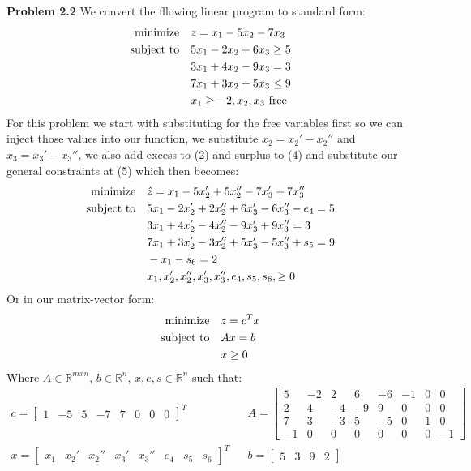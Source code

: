 \documentclass{article}
\begin{document}
\textbf{Problem 2.2} We convert the fllowing linear program to standard form:
\begin{align}
    \text{minimize} &\null \quad z = x_1 - 5x_2 - 7x_3 \\ 
    \text{subject to} &\null \quad 5x_1 - 2x_2 + 6x_3 \geq 5 \\
    & \quad 3x_1 + 4x_2 - 9x_3 = 3 \\
    & \quad 7x_1 + 3x_2 + 5x_3 \leq 9 \\
    & \quad x_1 \geq -2, x_2, x_3 \text{ free}
\end{align}
For this problem we start with substituting for the free variables first so we can inject those values into our function, we substitute $x_2 = x_2' - x_2''$ and $x_3 = x_3' - x_3''$, we also add excess to (2) and surplus to (4) and substitute our general constraints at (5) which then becomes:
\begin{align}
    \text{minimize} &\null \quad \hat{z} = x_1 - 5x_2' + 5x_2'' - 7x_3' + 7x_3'' \\ 
    \text{subject to} &\null \quad 5x_1 - 2x_2' + 2x_2'' + 6x_3' - 6x_3'' - e_4 = 5 \\
    & \quad 3x_1 + 4x_2' - 4x_2'' - 9x_3' + 9x_3'' = 3 \\
    & \quad 7x_1 + 3x_2' - 3x_2'' + 5x_3'- 5x_3'' + s_5 = 9  \\
    & \quad -x_1 - s_6 = 2 \\ 
    & \quad x_1,x_2',x_2'',x_3', x_3'', e_4, s_5, s_6, \geq 0
\end{align}
Or in our matrix-vector form: 
\begin{align*}
    \text{minimize} &\null \quad z = c^Tx \\
    \text{subject to} &\null \quad Ax=b \\
    & \quad x \geq 0
\end{align*}
Where $A \in \mathbb{R}^{mxn}$, $b \in \mathbb{R}^n$, $x, e, s \in \mathbb{R}^n$ such that:  
\begin{align*}c =
    \begin{bmatrix}
        1 & -5 & 5 & -7 & 7 & 0 & 0 & 0
    \end{bmatrix}^T && A =
    \begin{bmatrix}
        5 & -2 & 2 & 6 & -6 & -1 & 0 & 0 \\
        2 & 4 & -4 & -9 & 9 & 0 & 0 & 0 \\
        7 & 3 & -3 & 5 & -5 & 0 & 1 & 0 \\
        -1 & 0 & 0 & 0 & 0 & 0 & 0 & -1
    \end{bmatrix} \\ x =
    \begin{bmatrix}
        x_1 & x_2' & x_2'' & x_3' & x_3'' & e_4 & s_5 & s_6
    \end{bmatrix}^T && b =
    \begin{bmatrix}
        5 & 3 & 9 & 2
    \end{bmatrix}
\end{align*}
\end{document}
